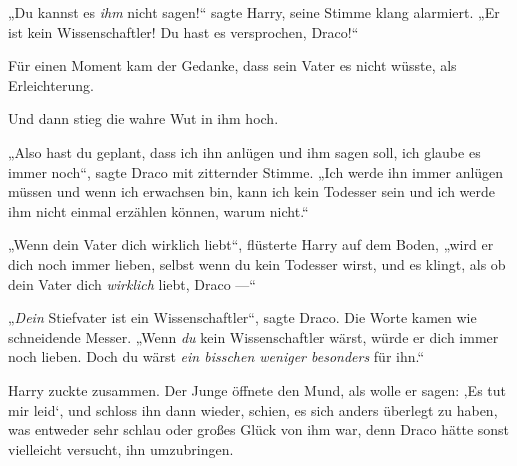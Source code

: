 „Du kannst es \emph{ihm} nicht sagen!“ sagte Harry, seine Stimme klang alarmiert.
„Er ist kein Wissenschaftler! Du hast es versprochen, Draco!“

Für einen Moment kam der Gedanke, dass sein Vater es nicht wüsste, als Erleichterung.

Und dann stieg die wahre Wut in ihm hoch.

„Also hast du geplant, dass ich ihn anlügen und ihm sagen soll, ich glaube es immer noch“, sagte Draco mit zitternder Stimme.
„Ich werde ihn immer anlügen müssen und wenn ich erwachsen bin, kann ich kein Todesser sein und ich werde ihm nicht einmal erzählen können, warum nicht.“

„Wenn dein Vater dich wirklich liebt“, flüsterte Harry auf dem Boden, „wird er dich noch immer lieben, selbst wenn du kein Todesser wirst, und es klingt, als ob dein Vater dich \emph{wirklich} liebt, Draco —“

„\emph{Dein} Stiefvater ist ein Wissenschaftler“, sagte Draco. Die Worte kamen wie schneidende Messer.
„Wenn \emph{du} kein Wissenschaftler wärst, würde er dich immer noch lieben. Doch du wärst \emph{ein bisschen weniger besonders} für ihn.“

Harry zuckte zusammen. Der Junge öffnete den Mund, als wolle er sagen: ‚Es tut mir leid‘, und schloss ihn dann wieder, schien, es sich anders überlegt zu haben, was entweder sehr schlau oder großes Glück von ihm war, denn Draco hätte sonst vielleicht versucht, ihn umzubringen.


